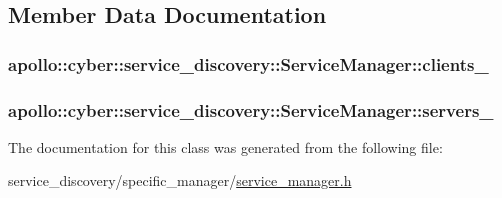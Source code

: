 \subsection{Member Data Documentation}
\hypertarget{classapollo_1_1cyber_1_1service__discovery_1_1ServiceManager_ae2d14ffd418fd7a75576eca529b9b277}{
\subsubsection[{clients\-\_\-}]{ apollo\-::cyber\-::service\-\_\-discovery\-::\-Service\-Manager\-::clients\-\_\-\hspace{0.3cm}{\ttfamily [private]}}}\label{classapollo_1_1cyber_1_1service__discovery_1_1ServiceManager_ae2d14ffd418fd7a75576eca529b9b277}
\hypertarget{classapollo_1_1cyber_1_1service__discovery_1_1ServiceManager_ac27c445960f7199217715a38325c490d}{
\subsubsection[{servers\-\_\-}]{ apollo\-::cyber\-::service\-\_\-discovery\-::\-Service\-Manager\-::servers\-\_\-\hspace{0.3cm}{\ttfamily [private]}}}\label{classapollo_1_1cyber_1_1service__discovery_1_1ServiceManager_ac27c445960f7199217715a38325c490d}


The documentation for this class was generated from the following file\-:\begin{DoxyCompactItemize}
\item 
service\-\_\-discovery/specific\-\_\-manager/\hyperlink{service__manager_8h}{service\-\_\-manager.\-h}\end{DoxyCompactItemize}
